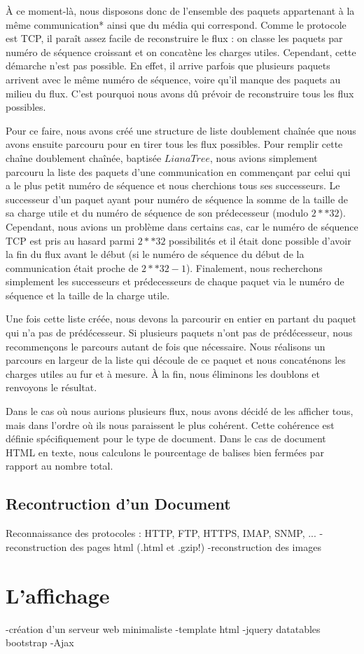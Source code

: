 \indent À ce moment-là, nous disposons donc de l'ensemble des paquets appartenant à la même communication* ainsi que du média qui correspond. Comme le protocole est TCP,
il paraît assez facile de reconstruire le flux : on classe les paquets par numéro de séquence croissant et on concatène les charges utiles. Cependant, cette démarche 
n'est pas possible. En effet, il arrive parfois que plusieurs paquets arrivent avec le même numéro de séquence, voire qu'il manque des paquets au milieu du flux.
C'est pourquoi nous avons dû prévoir de reconstruire tous les flux possibles.


\indent Pour ce faire, nous avons créé une structure de liste doublement chaînée que nous avons ensuite parcouru pour en tirer tous les flux possibles. Pour remplir cette chaîne
doublement chaînée, baptisée $LianaTree$, nous avions simplement parcouru la liste des paquets d'une communication en commençant par celui qui a le plus petit numéro de séquence et 
nous cherchions tous ses successeurs. Le successeur d'un paquet ayant pour numéro de séquence la somme de la taille de sa charge utile et du numéro de séquence de son prédecesseur 
(modulo $2**32$).
Cependant, nous avions un problème dans certains cas, car le numéro de séquence TCP est pris au hasard parmi $2**32$ possibilités et il était donc possible d'avoir la fin du flux 
avant le début (si le numéro de séquence du début de la communication était proche de $2**32 -1$). Finalement, nous recherchons simplement les successeurs et prédecesseurs de chaque
paquet via le numéro de séquence et la taille de la charge utile.

Une fois cette liste créée, nous devons la parcourir en entier en partant du paquet qui n'a pas de prédécesseur. Si plusieurs paquets n'ont pas de prédécesseur, nous recommençons le parcours autant de fois que nécessaire. Nous réalisons un parcours en largeur de la liste qui découle de ce paquet et nous concaténons les charges utiles au fur et à mesure. À la fin, nous éliminons
 les doublons et renvoyons le résultat.



Dans le cas où nous aurions plusieurs flux, nous avons décidé de les afficher tous, mais dans l'ordre où ils nous paraissent le plus cohérent. Cette cohérence est définie spécifiquement 
pour le type de document. Dans le cas de document HTML en texte, nous calculons le pourcentage de balises bien fermées par rapport au nombre total.

\subsection{Recontruction d'un Document}
Reconnaissance des protocoles : HTTP, FTP, HTTPS, IMAP, SNMP, ...
-reconstruction des pages html (.html et .gzip!)
-reconstruction des images

\section{L'affichage}
-création d'un serveur web minimaliste
-template html
-jquery datatables bootstrap
-Ajax
